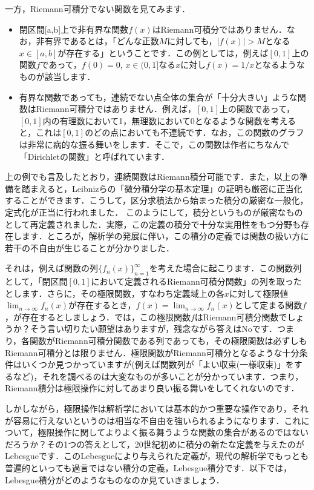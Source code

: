 \par 一方，Riemann可積分でない関数を見てみます．
\begin{itemize}
\item 閉区間[a,b]上で非有界な関数$f(x)$はRiemann可積分ではありません．なお，非有界であるとは，「どんな正数$M$に対しても，$\left|f(x)\right|>M$となる$x\in[a,b]$が存在する」ということです．この例としては，例えば$[0,1]$上の関数$f$であって，$f(0)=0$, $x\in(0,1]$なる$x$に対し$f(x)=1/x$となるようなものが該当します．
\item 有界な関数であっても，連続でない点全体の集合が「十分大きい」ような関数はRiemann可積分ではありません．例えば，$[0,1]$上の関数であって，$[0,1]$内の有理数において1，無理数において0となるような関数を考えると，これは$[0,1]$のどの点においても不連続です．なお，この関数のグラフは非常に病的な振る舞いをします．そこで，この関数は作者にちなんで「Dirichletの関数」と呼ばれています．
\end{itemize}
\par 上の例でも言及したとおり，連続関数はRiemann積分可能です．また，以上の準備を踏まえると，Leibnizらの「微分積分学の基本定理」の証明も厳密に正当化することができます．こうして，区分求積法から始まった積分の厳密な一般化，定式化が正当に行われました．
このようにして，積分というものが厳密なものとして再定義されました．実際，この定義の積分で十分な実用性をもつ分野も存在します．ところが，解析学の発展に伴い，この積分の定義では関数の扱い方に若干の不自由が生じることが分かりました．
\par それは，例えば関数の列$\{f_n(x)\}_{n=1}^{\infty}$を考えた場合に起こります．この関数列として，「閉区間$[0,1]$において定義されるRiemann可積分関数」の列を取ったとします．さらに，その極限関数，すなわち定義域上の各$x$に対して極限値$\displaystyle\lim _{n \to \infty}f_{n}(x)$が存在するとき，$f(x)=\displaystyle\lim _{n \to \infty}f_{n}(x)$として定まる関数$f$，が存在するとしましょう．では，この極限関数$f$はRiemann可積分関数でしょうか？そう言い切りたい願望はありますが，残念ながら答えはNoです．つまり，各関数がRiemann可積分関数である列であっても，その極限関数は必ずしもRiemann可積分とは限りません．極限関数がRiemann可積分となるような十分条件はいくつか見つかっていますが(例えば関数列が「よい収束(一様収束)」をするなど)，それを調べるのは大変なものが多いことが分かっています．つまり，Riemann積分は極限操作に対してあまり良い振る舞いをしてくれないのです．
\par しかしながら，極限操作は解析学においては基本的かつ重要な操作であり，それが容易に行えないというのは相当な不自由を強いられるようになります．これについて，極限操作に関してよりよく振る舞うような関数の集合があるのではないだろうか？その1つの答えとして，20世紀初めに積分の新たな定義を与えたのがLebesgueです．このLebesgueにより与えられた定義が，現代の解析学でもっとも普遍的といっても過言ではない積分の定義，Lebesgue積分です．以下では，Lebesgue積分がどのようなものなのか見ていきましょう．
